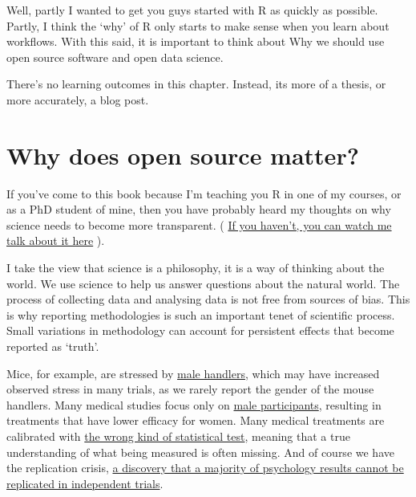 \documentclass[
]{book}
\begin{document}
Well, partly I wanted to get you guys started with R as quickly as possible. Partly, I think the `why' of R only starts to make sense when you learn about workflows. With this said, it is important to think about Why we should use open source software and open data science.

There's no learning outcomes in this chapter. Instead, its more of a thesis, or more accurately, a blog post.

\hypertarget{why-does-open-source-matter}{%
\section{Why does open source matter?}\label{why-does-open-source-matter}}

If you've come to this book because I'm teaching you R in one of my courses, or as a PhD student of mine, then you have probably heard my thoughts on why science needs to become more transparent. ( \href{https://media.ed.ac.uk/media/1_ixecew3h}{If you haven't, you can watch me talk about it here} ).

I take the view that science is a philosophy, it is a way of thinking about the world. We use science to help us answer questions about the natural world. The process of collecting data and analysing data is not free from sources of bias. This is why reporting methodologies is such an important tenet of scientific process. Small variations in methodology can account for persistent effects that become reported as `truth'.

Mice, for example, are stressed by \href{https://www.nature.com/news/male-researchers-stress-out-rodents-1.15106\#:~:text=Male\%2C\%20but\%20not\%20female\%2C\%20experimenters,today\%20in\%20Nature\%20Methods1.\&text=For\%20years\%2C\%20anecdotal\%20reports\%20have,handler\%20remains\%20in\%20the\%20room.}{male handlers}, which may have increased observed stress in many trials, as we rarely report the gender of the mouse handlers. Many medical studies focus only on \href{https://www.ncbi.nlm.nih.gov/pmc/articles/PMC1761670/}{male participants}, resulting in treatments that have lower efficacy for women. Many medical treatments are calibrated with \href{https://pubmed.ncbi.nlm.nih.gov/2868172/}{the wrong kind of statistical test}, meaning that a true understanding of what being measured is often missing. And of course we have the replication crisis, \href{https://www.vox.com/2016/3/14/11219446/psychology-replication-crisis}{a discovery that a majority of psychology results cannot be replicated in independent trials}.
\end{document}
